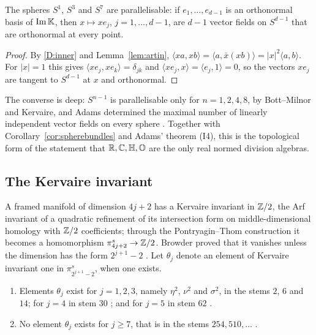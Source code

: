 \begin{proposition}\label{prop:parallelisable}
The spheres $S^1$, $S^3$ and $S^7$ are parallelisable: if $e_1,\dots,e_{d-1}$ is an orthonormal basis of $\operatorname{Im}\mathbb{K}$, then $x\mapsto xe_j$, $j=1,\dots,d-1$, are $d-1$ vector fields on $S^{d-1}$ that are orthonormal at every point.
\end{proposition}

\begin{proof}
By \ref{D:inner} and Lemma~\ref{lem:artin}, $\langle xa,xb\rangle=\langle a,\bar x(xb)\rangle=|x|^2\langle a,b\rangle$. For $|x|=1$ this gives $\langle xe_j,xe_k\rangle=\delta_{jk}$ and $\langle xe_j,x\rangle=\langle e_j,1\rangle=0$, so the vectors $xe_j$ are tangent to $S^{d-1}$ at $x$ and orthonormal.
\end{proof}

The converse is deep: $S^{n-1}$ is parallelisable only for $n=1,2,4,8$, by Bott--Milnor \cite{BM58} and Kervaire, and Adams determined the maximal number of linearly independent vector fields on every sphere \cite{Ada62}. Together with Corollary~\ref{cor:spherebundles} and Adams' theorem (I4), this is the topological form of the statement that $\mathbb{R},\mathbb{C},\mathbb{H},\mathbb{O}$ are the only real normed division algebras.

\subsection{The Kervaire invariant}\label{sec:kervaire}

A framed manifold of dimension $4j+2$ has a Kervaire invariant in $\mathbb{Z}/2$, the Arf invariant of a quadratic refinement of its intersection form on middle-dimensional homology with $\mathbb{Z}/2$ coefficients; through the Pontryagin--Thom construction it becomes a homomorphism $\pi_{4j+2}^s\to\mathbb{Z}/2$. Browder proved that it vanishes unless the dimension has the form $2^{j+1}-2$ \cite{Bro69}. Let $\theta_j$ denote an element of Kervaire invariant one in $\pi_{2^{j+1}-2}^s$, when one exists.

\begin{theorem}\label{thm:kervaire}
\begin{enumerate}[label=\textup{(\roman*)}]
\item Elements $\theta_j$ exist for $j=1,2,3$, namely $\eta^2$, $\nu^2$ and $\sigma^2$, in the stems $2$, $6$ and $14$; for $j=4$ in stem $30$ \cite{BMT70}; and for $j=5$ in stem $62$ \cite{BJM84}.
\item No element $\theta_j$ exists for $j\ge7$, that is in the stems $254,510,\dots$ \cite{HHR16}.
\end{enumerate}
\end{theorem}

